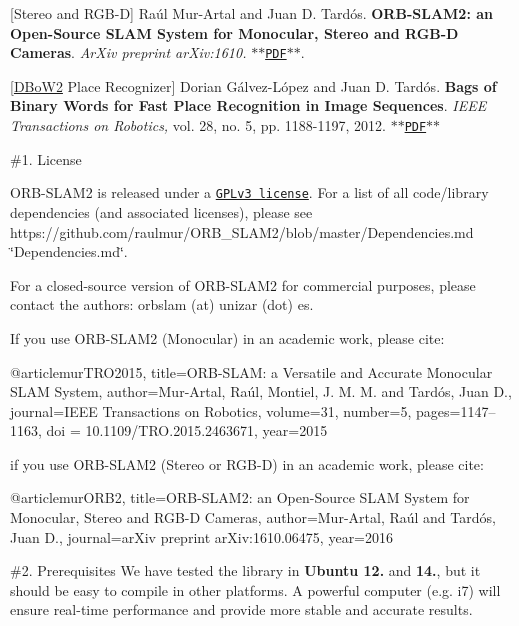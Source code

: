 \mbox{[}Stereo and R\-G\-B-\/\-D\mbox{]} Raúl Mur-\/\-Artal and Juan D. Tardós. {\bfseries O\-R\-B-\/\-S\-L\-A\-M2\-: an Open-\/\-Source S\-L\-A\-M System for Monocular, Stereo and R\-G\-B-\/\-D Cameras}. {\itshape Ar\-Xiv preprint ar\-Xiv\-:1610.} $\ast$$\ast$\href{https://128.84.21.199/pdf/1610.06475.pdf}{\tt P\-D\-F}$\ast$$\ast$.

\mbox{[}\hyperlink{namespaceDBoW2}{D\-Bo\-W2} Place Recognizer\mbox{]} Dorian Gálvez-\/\-López and Juan D. Tardós. {\bfseries Bags of Binary Words for Fast Place Recognition in Image Sequences}. {\itshape I\-E\-E\-E Transactions on Robotics,} vol. 28, no. 5, pp. 1188-\/1197, 2012. $\ast$$\ast$\href{http://doriangalvez.com/php/dl.php?dlp=GalvezTRO12.pdf}{\tt P\-D\-F}$\ast$$\ast$

\#1. License

O\-R\-B-\/\-S\-L\-A\-M2 is released under a \href{https://github.com/raulmur/ORB_SLAM2/blob/master/License-gpl.txt}{\tt G\-P\-Lv3 license}. For a list of all code/library dependencies (and associated licenses), please see https\-://github.com/raulmur/\-O\-R\-B\-\_\-\-S\-L\-A\-M2/blob/master/\-Dependencies.\-md \char`\"{}\-Dependencies.\-md\char`\"{}.

For a closed-\/source version of O\-R\-B-\/\-S\-L\-A\-M2 for commercial purposes, please contact the authors\-: orbslam (at) unizar (dot) es.

If you use O\-R\-B-\/\-S\-L\-A\-M2 (Monocular) in an academic work, please cite\-: \begin{DoxyVerb}@article{murTRO2015,
  title={{ORB-SLAM}: a Versatile and Accurate Monocular {SLAM} System},
  author={Mur-Artal, Ra\'ul, Montiel, J. M. M. and Tard\'os, Juan D.},
  journal={IEEE Transactions on Robotics},
  volume={31},
  number={5},
  pages={1147--1163},
  doi = {10.1109/TRO.2015.2463671},
  year={2015}
 }
\end{DoxyVerb}


if you use O\-R\-B-\/\-S\-L\-A\-M2 (Stereo or R\-G\-B-\/\-D) in an academic work, please cite\-: \begin{DoxyVerb}@article{murORB2,
  title={{ORB-SLAM2}: an Open-Source {SLAM} System for Monocular, Stereo and {RGB-D} Cameras},
  author={Mur-Artal, Ra\'ul and Tard\'os, Juan D.},
  journal={arXiv preprint arXiv:1610.06475},
  year={2016}
 }
\end{DoxyVerb}


\#2. Prerequisites We have tested the library in {\bfseries Ubuntu 12.} and {\bfseries 14.}, but it should be easy to compile in other platforms. A powerful computer (e.\-g. i7) will ensure real-\/time performance and provide more stable and accurate results.

